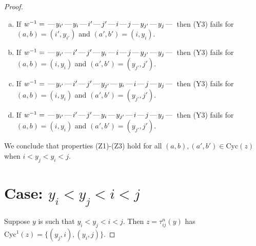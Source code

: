 \documentclass[10pt]{article}
\theoremstyle{definition}
\theoremstyle{definition}
\def\dash{\text{\hspace{0.5mm}---\hspace{0.5mm}}}
\def\Cyc{\mathrm{Cyc}}
\begin{document}
\begin{proof}
\begin{enumerate}
\begin{enumerate}[(a)]
\item If $w^{-1} = \dash y_{i'}\dash y_i\dash i'\dash j'\dash i\dash j\dash y_{j'}\dash y_j\dash $ then (Y3) fails for $(a,b)=(i',y_{i'})$ and $(a',b')=(i,y_i)$.
\item If $w^{-1} = \dash y_{i'}\dash i'\dash j'\dash y_i\dash i\dash j\dash y_{j'}\dash y_j\dash $ then (Y3) fails for $(a,b)=(i,y_i)$ and $(a',b')=(y_{j'},j')$.
\item If $w^{-1} = \dash y_{i'}\dash i'\dash j'\dash y_{j'}\dash y_i\dash i\dash j\dash y_j\dash $ then (Y3) fails for $(a,b)=(i,y_i)$ and $(a',b')=(y_{j'},j')$.
\item If $w^{-1} = \dash y_{i'}\dash i'\dash j'\dash y_i\dash y_{j'}\dash i\dash j\dash y_j\dash $ then (Y3) fails for $(a,b)=(i,y_i)$ and $(a',b')=(y_{j'},j')$.
\end{enumerate}
\end{enumerate}
We conclude that properties (Z1)-(Z3) hold for all 
$(a,b),(a',b') \in \Cyc(z)$ when $i < y_j < y_i < j$.
\section{Case: $y_i < y_j < i < j$}
Suppose $y$ is such that $y_i < y_j < i < j$.
Then $z = \tau^n_{ij}(y)$ has $\Cyc^1(z) = \{(y_j,i),(y_i,j)\}.$

\end{proof}
\end{document}
